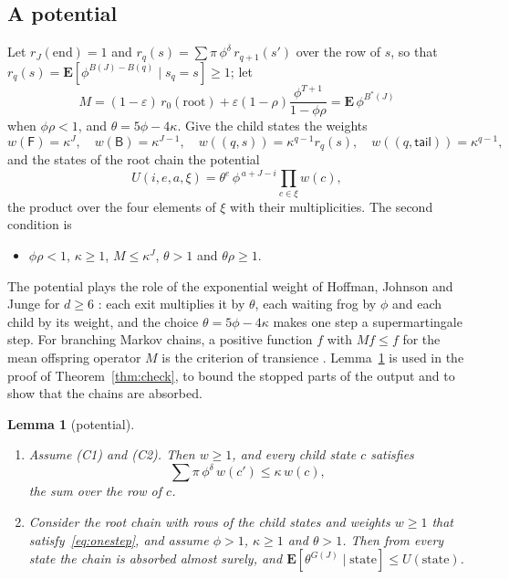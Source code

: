 \documentclass[11pt]{amsart}
\newtheorem{lemma}[theorem]{Lemma}
\theoremstyle{definition}
\numberwithin{equation}{section}
\newcommand{\lean}[1]{\ignorespaces}
\newcommand{\E}{\mathbf{E}}
\newcommand{\eps}{\varepsilon}
\begin{document}
\subsection{A potential}
Let $r_J(\mathrm{end})=1$ and $r_q(s)=\sum\pi\,\phi^{\delta}\,r_{q+1}(s')$ over the row of $s$, so that $r_q(s)=\E[\phi^{B(J)-B(q)}\mid s_q=s]\ge1$; let
\[
M=(1-\eps)\,r_0(\mathrm{root})+\eps(1-\rho)\frac{\phi^{T+1}}{1-\phi\rho}=\E\,\phi^{B^*(J)}
\]
when $\phi\rho<1$, and $\theta=5\phi-4\kappa$. Give the child states the weights
\[
w(\mathsf F)=\kappa^J,\quad w(\mathsf B)=\kappa^{J-1},\quad w((q,s))=\kappa^{q-1}r_q(s),\quad w((q,\mathsf{tail}))=\kappa^{q-1},
\]
and the states of the root chain the potential
\[
U(i,e,a,\xi)=\theta^{e}\,\phi^{\,a+J-i}\prod_{c\in\xi}w(c),
\]
the product over the four elements of $\xi$ with their multiplicities. The second condition is
\begin{itemize}
\item[(C2)] $\phi\rho<1$, $\kappa\ge1$, $M\le\kappa^J$, $\theta>1$ and $\theta\rho\ge1$.
\end{itemize}

The potential plays the role of the exponential weight of Hoffman, Johnson and Junge for $d\ge6$ \cite[Proposition~18]{HJJ17}: each exit multiplies it by $\theta$, each waiting frog by $\phi$ and each child by its weight, and the choice $\theta=5\phi-4\kappa$ makes one step a supermartingale step. For branching Markov chains, a positive function $f$ with $Mf\le f$ for the mean offspring operator $M$ is the criterion of transience \cite[Theorem~2.1]{Mul08a}. Lemma~\ref{lem:potential} is used in the proof of Theorem~\ref{thm:check}, to bound the stopped parts of the output and to show that the chains are absorbed.

\begin{lemma}[potential]\label{lem:potential}\lean{FrogModel.LemmaX.lemma61_holds, FrogModel.LemmaX.Lemma61, FrogModel.Cert.Data.child_mean_le, FrogModel.Cert.Data.r_step, FrogModel.Cert.Data.one_le_r, FrogModel.Cert.Data.one_le_weight} %
\begin{enumerate}
\item Assume (C1) and (C2). Then $w\ge1$, and every child state $c$ satisfies
\begin{equation}\label{eq:onestep}
\sum\pi\,\phi^{\delta}\,w(c')\le\kappa\,w(c),
\end{equation}
the sum over the row of $c$.
\item Consider the root chain with rows of the child states and weights $w\ge1$ that satisfy~\eqref{eq:onestep}, and assume $\phi>1$, $\kappa\ge1$ and $\theta>1$. Then from every state the chain is absorbed almost surely, and $\E[\theta^{G(J)}\mid\text{state}]\le U(\text{state})$.
\end{enumerate}
\end{lemma}
\end{document}
